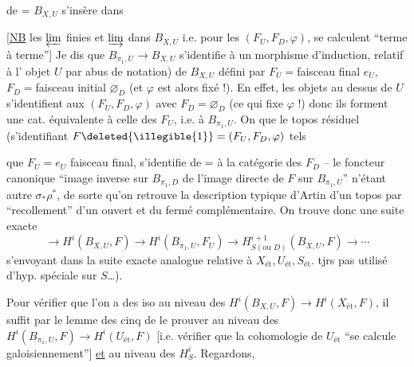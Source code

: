 de = $B_{X,U}$ s'insère dans

[\uline{NB} les $\varprojlim$ finies et $\varinjlim$ 
dans $B_{X,U}$ i.e. pour les $(F_U,F_D,\varphi)$, se
calculent ``terme à terme''] Je dis
que $B_{\pi_1,U}\longrightarrow B_{X,U}$ s'identifie à un
morphisme d'induction, relatif à l'
objet   $U$ par abus de notation)
de $B_{X,U}$ défini par
$F_U={}$faisceau final $e_U$, $F_D={}$faisceau initial $\varnothing_D$
(et $\varphi$ est alors fixé !). En effet, les
objets  au dessus de $U$ s'identifient aux
$(F_U,F_D,\varphi)$ avec $F_D=\varnothing_D$ (ce qui fixe $\varphi$ !) donc
ils forment une cat. équivalente à celle des
$F_U$, i.e. à $B_{\pi_1,U}$. On  que le topos
résiduel (s'identifiant   $F\deleted{\illegible{1}}=(F_U,F_D,\varphi)$ tels

que $F_U=e_U$ faisceau final, s'identifie de = à la
catégorie  des $F_D$  -- le foncteur
canonique ``image inverse sur $B_{\pi_1,D}$ de l'image
directe de $F$ sur $B_{\pi_1,U}$'' n'étant autre
$\sigma_*\rho^*$, de sorte qu'on retrouve la description
 typique d'Artin d'un topos 
par ``recollement'' d'un  ouvert et du
fermé complémentaire.
On trouve donc une suite exacte
\[
\longrightarrow H^i(B_{X,U},F)\longrightarrow
H^i(B_{\pi_1,U},F_U)\longrightarrow
H^{i+1}_{S(\text{ou }D)}(B_{X,U},F)\longrightarrow\cdots
\]
s'envoyant dans la suite exacte analogue
relative à $X_{\mathrm{ét}},U_{\mathrm{ét}},S_{\mathrm{ét}}$.  
tjrs pas utilisé d'hyp. spéciale sur $S$\ldots).

Pour vérifier que l'on a des iso
au niveau des $H^i(B_{X,U},F)\longrightarrow H^i(X_{\mathrm{ét}},F)$,
il suffit par le lemme des cinq de
le prouver au niveau des
$H^i(B_{\pi_1,U},F)\longrightarrow H^i(U_{\mathrm{ét}},F)$ [i.e. vérifier que la
cohomologie de $U_{\mathrm{ét}}$ ``se calcule galoisiennement'']
\uline{et} au niveau des $H^i_S$.  Regardons,


